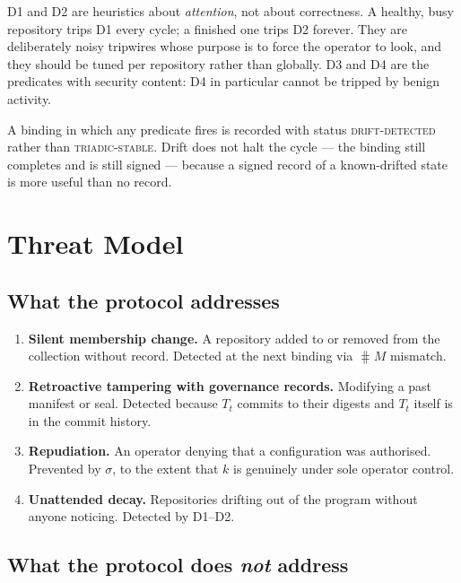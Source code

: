 \documentclass[11pt,a4paper]{article}
\begin{document}
\begin{remark}[On D1 and D2]
D1 and D2 are heuristics about \emph{attention}, not about correctness. A
healthy, busy repository trips D1 every cycle; a finished one trips D2
forever. They are deliberately noisy tripwires whose purpose is to force the
operator to look, and they should be tuned per repository rather than
globally. D3 and D4 are the predicates with security content: D4 in
particular cannot be tripped by benign activity.
\end{remark}

A binding in which any predicate fires is recorded with status
\textsc{drift-detected} rather than \textsc{triadic-stable}. Drift does not
halt the cycle --- the binding still completes and is still signed --- because a
signed record of a known-drifted state is more useful than no record.

\section{Threat Model}
\label{sec:threat}

\subsection{What the protocol addresses}

\begin{enumerate}[label=T\arabic*.,leftmargin=2.6em]
  \item \textbf{Silent membership change.} A repository added to or removed
        from the collection without record. Detected at the next binding via
        $\hash{M}$ mismatch.
  \item \textbf{Retroactive tampering with governance records.} Modifying a
        past manifest or seal. Detected because $T_t$ commits to their
        digests and $T_t$ itself is in the commit history.
  \item \textbf{Repudiation.} An operator denying that a configuration was
        authorised. Prevented by $\sigma$, to the extent that $k$ is
        genuinely under sole operator control.
  \item \textbf{Unattended decay.} Repositories drifting out of the program
        without anyone noticing. Detected by D1--D2.
\end{enumerate}

\subsection{What the protocol does \emph{not} address}
\label{sec:nonthreats}
\end{document}
